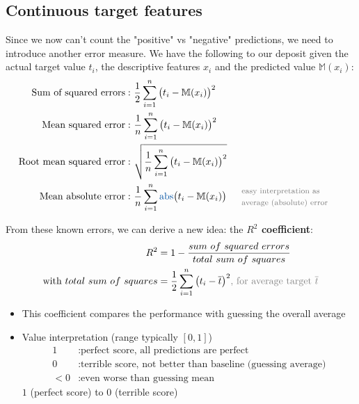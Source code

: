\subsection{Continuous target features}

Since we now can't count the "positive" vs "negative" predictions, we need to introduce another error measure. We have the following to our deposit given the actual target value $t_i$, the descriptive features $x_i$ and the predicted value $\mathbb{M}(x_i)$:
\begin{align*}
  \text{Sum of squared errors}: &\  \frac{1}{2} \sum_{i=1}^n\big( t_i - \mathbb{M}(x_i) \big)^2\\
  \text{Mean squared error}: &\  \frac{1}{n} \sum_{i=1}^n\big( t_i - \mathbb{M}(x_i) \big)^2\\
  \text{Root mean squared error}: &\ \sqrt{\frac{1}{n} \sum_{i=1}^n\big( t_i - \mathbb{M}(x_i) \big)^2}\\
  \text{Mean absolute error}: &\ \frac{1}{n} \sum_{i=1}^n \text{\color{mathblue} abs} \big( t_i - \mathbb{M}(x_i) \big) && \begin{array}{l}\text{\footnotesize\color{gray}easy interpretation as}\\\text{\footnotesize\color{gray}average (absolute) error}\end{array}
\end{align*}

From these known errors, we can derive a new idea: the \textbf{$R^2$ coefficient}:
\begin{align*}
  R^2 &= 1 - \frac{sum\ of\ squared\ errors}{total\ sum\ of\ squares}\\
  \text{with } total\ sum\ of\ squares &= \frac{1}{2} \sum_{i=1}^n \big( t_i - \overline{t} \big)^2 {\color{gray}\text{\color{gray} , for average target } \overline{t}}
\end{align*}
\begin{itemize}
  \item This coefficient compares the performance with guessing the overall average
  \item Value interpretation (range typically $[0,1]$)
  \begin{align*}
    1 &: \text{perfect score, all predictions are perfect}\\
    0 &: \text{terrible score, not better than baseline (guessing average)}\\
    <0 &: \text{even worse than guessing mean}
  \end{align*}
  $1$ (perfect score) to $0$ (terrible score)
\end{itemize}

